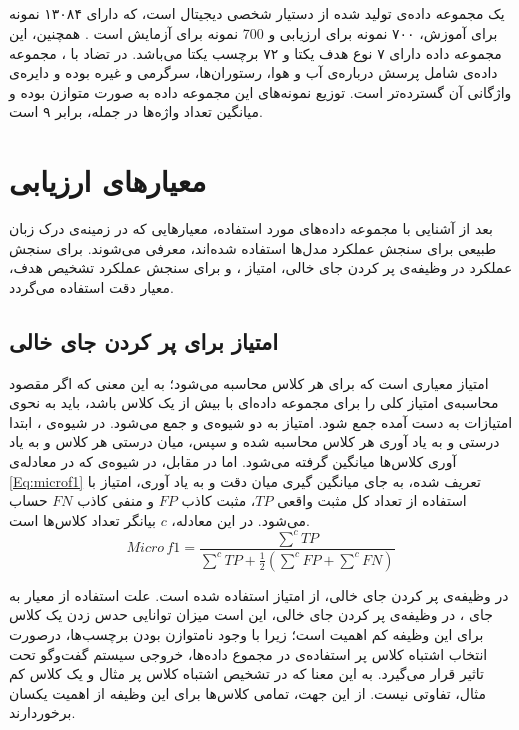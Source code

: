 \subsection{}
 یک مجموعه داده‌ی تولید شده از دستیار شخصی دیجیتال  است، که دارای ۱۳۰۸۴ نمونه برای آموزش، ۷۰۰ نمونه برای ارزیابی و 700 نمونه برای آزمایش است \cite{snips:coucke2018}. همچنین، این مجموعه داده دارای ۷ نوع هدف یکتا و ۷۲ برچسب یکتا می‌باشد. در تضاد با ، مجموعه داده‌ی  شامل پرسش درباره‌ی آب و هوا، رستوران‌ها، سرگرمی و غیره بوده  و دایره‌ی واژگانی آن گسترده‌تر است. توزیع نمونه‌های این مجموعه داده به صورت متوازن بوده و میانگین تعداد واژه‌ها در جمله، برابر ۹ است.
\section{معیارهای ارزیابی}
بعد از آشنایی با مجموعه داده‌های مورد استفاده، معیارهایی که در زمینه‌ی درک زبان طبیعی برای سنجش عملکرد مدل‌ها استفاده شده‌اند، معرفی می‌شوند. برای سنجش عملکرد در وظیفه‌ی پر کردن جای خالی، امتیاز ، و برای سنجش عملکرد تشخیص هدف، معیار دقت استفاده می‌گردد.
\subsection{امتیاز  برای پر کردن جای خالی}
امتیاز  معیاری است که برای هر کلاس محاسبه می‌شود؛ به این معنی که اگر مقصود محاسبه‌ی امتیاز کلی  را برای مجموعه داده‌ای با بیش از یک کلاس باشد، باید به نحوی امتیازات به دست آمده جمع شود. امتیاز  به دو شیوه‌ی  و  جمع می‌شود. در شیوه‌ی ، ابتدا درستی و به یاد آوری هر کلاس محاسبه شده و سپس، میان درستی هر کلاس و به یاد آوری کلاس‌ها میانگین گرفته می‌شود. اما در مقابل، در شیوه‌ی  که در معادله‌ی \ref{Eq:microf1} تعریف شده، به جای میانگین گیری میان دقت و به یاد آوری، امتیاز  با استفاده از تعداد کل مثبت واقعی $TP$، مثبت کاذب $FP$ و منفی کاذب $FN$ حساب می‌شود. در این معادله، $c$ بیانگر تعداد کلاس‌ها است.
\begin{equation}
	Micro\,f1 = \frac{\sum^{c}TP}{\sum^{c}TP+\frac{1}{2}(\sum^{c}FP+\sum^{c}FN)}
	\label{Eq:microf1}
\end{equation}


در وظیفه‌ی پر کردن جای خالی، از امتیاز  استفاده شده است. علت استفاده از معیار  به جای ، در وظیفه‌ی پر کردن جای خالی، این است میزان توانایی حدس زدن یک کلاس برای این وظیفه کم اهمیت است؛ زیرا با وجود نامتوازن بودن برچسب‌ها، درصورت انتخاب اشتباه کلاس پر استفاده‌ی  در مجموع داده‌ها، خروجی سیستم گفت‌وگو تحت تاثیر قرار می‌گیرد. به این معنا که در تشخیص اشتباه کلاس پر مثال  و یک کلاس کم مثال، تفاوتی نیست. از این جهت، تمامی کلاس‌ها برای این وظیفه از اهمیت یکسان برخوردارند.


